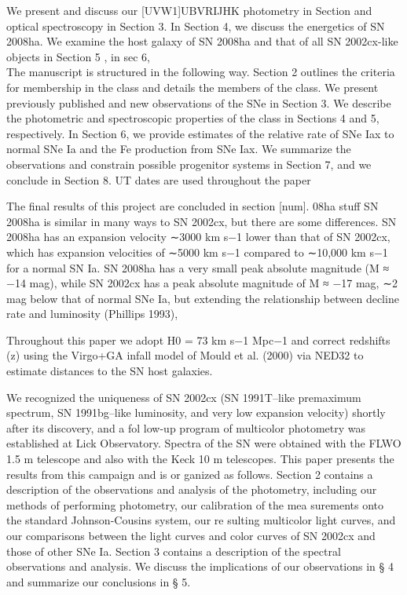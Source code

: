 \documentclass[preprint2]{aastex}
\begin{document}
We present and discuss our [UVW1]UBVRIJHK photometry
in Section and optical spectroscopy in Section 3. In Section 4,
we discuss the energetics of SN 2008ha. We examine the host
galaxy of SN 2008ha and that of all SN 2002cx-like objects in
Section 5 , in sec 6, 
\\

The manuscript is structured in the following way. Section 2
outlines the criteria for membership in the class and details
the members of the class. We present previously published
and new observations of the SNe in Section 3. We describe
the photometric and spectroscopic properties of the class in
Sections 4 and 5, respectively. In Section 6, we provide estimates
of the relative rate of SNe Iax to normal SNe Ia and the Fe
production from SNe Iax. We summarize the observations and
constrain possible progenitor systems in Section 7, and we
conclude in Section 8. UT dates are used throughout the paper


The final results of this project are concluded in section [num]. 
08ha stuff
SN 2008ha is similar in many ways to
SN 2002cx, but there are some differences. SN 2008ha has an
expansion velocity ∼3000 km s−1 lower than that of SN 2002cx,
which has expansion velocities of ∼5000 km s−1 compared
to ∼10,000 km s−1 for a normal SN Ia. SN 2008ha has a
very small peak absolute magnitude (M ≈ −14 mag), while
SN 2002cx has a peak absolute magnitude of M ≈ −17 mag,
∼2 mag below that of normal SNe Ia, but extending the
relationship between decline rate and luminosity (Phillips 1993),

Throughout this paper we adopt H0 = 73 km s−1 Mpc−1 and
correct redshifts (z) using the Virgo+GA infall model of Mould
et al. (2000) via NED32 to estimate distances to the SN host
galaxies.

We recognized the uniqueness of SN 2002cx (SN 1991T–like
premaximum spectrum, SN 1991bg–like luminosity, and very
low expansion velocity) shortly after its discovery, and a fol
low-up program of multicolor photometry was established at
Lick Observatory. Spectra of the SN were obtained with the
FLWO 1.5 m telescope and also with the Keck 10 m telescopes.
This paper presents the results from this campaign and is or
ganized as follows. Section 2 contains a description of the
observations and analysis of the photometry, including our
methods of performing photometry, our calibration of the mea
surements onto the standard Johnson-Cousins system, our re
sulting multicolor light curves, and our comparisons between
the light curves and color curves of SN 2002cx and those of
other SNe Ia. Section 3 contains a description of the spectral
observations and analysis. We discuss the implications of our
observations in § 4 and summarize our conclusions in § 5.
\end{document}
